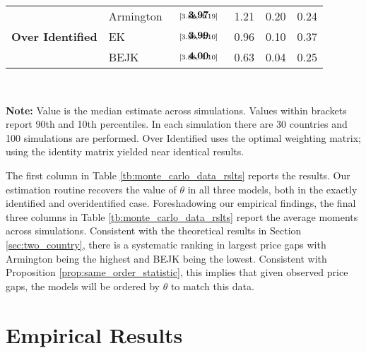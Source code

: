 \documentclass[12pt,dvips, ps2pdf]{article}
\begin{document}
\begin{table}[!h]
\begin{center}
\begin{tabular}[t]{l l  c | c c c}
\hline
\multirow{4}{*}{\textbf{Over Identified}} & Armington   & $\begin{array}{c}{\textbf{3.97}} \vspace{-.4cm}\\ \scriptstyle{[3.82,   \ 4.19]}\end{array}$   & 1.21 & 0.20  & 0.24   \\
& EK              & $\begin{array}{c}{\textbf{3.99}} \vspace{-.4cm}\\ \scriptstyle{[3.90,   \ 4.10]}\end{array}$  & 0.96 & 0.10  &0.37             \\
&  BEJK            & $\begin{array}{c}{\textbf{4.00}} \vspace{-.4cm}\\ \scriptstyle{[3.88,   \ 4.10]}\end{array}$     & 0.63 & 0.04&  0.25 \\
\hline
\end{tabular}
\\[0.75ex]
\parbox{5.65in}{\footnotesize  \textbf{Note:} Value is the median estimate across simulations. Values within brackets report 90th and 10th percentiles. In each simulation there are 30 countries and 100 simulations are performed. Over Identified uses the optimal weighting matrix; using the identity matrix yielded near identical results.}
\end{center}
\end{table}


The first column in Table \ref{tb:monte_carlo_data_rslts} reports the results. Our estimation routine recovers the value of $\theta$ in all three models, both in the exactly identified and overidentified case. Foreshadowing our empirical findings, the final three columns in Table \ref{tb:monte_carlo_data_rslts} report the average moments across simulations. Consistent with the theoretical results in Section \ref{sec:two_country}, there is a systematic ranking in largest price gaps with Armington being the highest and BEJK being the lowest. Consistent with Proposition \ref{prop:same_order_statistic}, this implies that given observed price gaps, the models will be ordered by $\theta$ to match this data.

\newpage

\section{Empirical Results}
\end{document}
